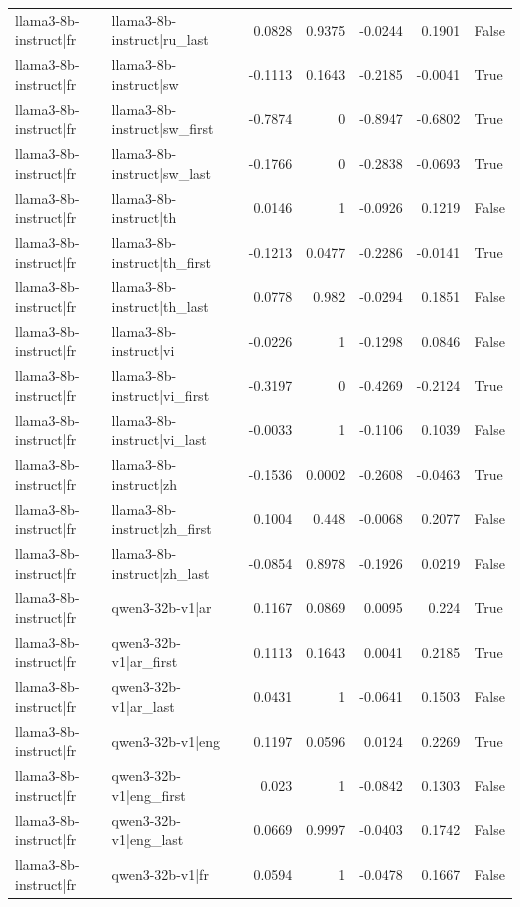 \begin{table}
\begin{tabular}{l l r r r r l}
llama3-8b-instruct|fr & llama3-8b-instruct|ru_last & 0.0828 & 0.9375 & -0.0244 & 0.1901 & False \\
llama3-8b-instruct|fr & llama3-8b-instruct|sw & -0.1113 & 0.1643 & -0.2185 & -0.0041 & True \\
llama3-8b-instruct|fr & llama3-8b-instruct|sw_first & -0.7874 & 0 & -0.8947 & -0.6802 & True \\
llama3-8b-instruct|fr & llama3-8b-instruct|sw_last & -0.1766 & 0 & -0.2838 & -0.0693 & True \\
llama3-8b-instruct|fr & llama3-8b-instruct|th & 0.0146 & 1 & -0.0926 & 0.1219 & False \\
llama3-8b-instruct|fr & llama3-8b-instruct|th_first & -0.1213 & 0.0477 & -0.2286 & -0.0141 & True \\
llama3-8b-instruct|fr & llama3-8b-instruct|th_last & 0.0778 & 0.982 & -0.0294 & 0.1851 & False \\
llama3-8b-instruct|fr & llama3-8b-instruct|vi & -0.0226 & 1 & -0.1298 & 0.0846 & False \\
llama3-8b-instruct|fr & llama3-8b-instruct|vi_first & -0.3197 & 0 & -0.4269 & -0.2124 & True \\
llama3-8b-instruct|fr & llama3-8b-instruct|vi_last & -0.0033 & 1 & -0.1106 & 0.1039 & False \\
llama3-8b-instruct|fr & llama3-8b-instruct|zh & -0.1536 & 0.0002 & -0.2608 & -0.0463 & True \\
llama3-8b-instruct|fr & llama3-8b-instruct|zh_first & 0.1004 & 0.448 & -0.0068 & 0.2077 & False \\
llama3-8b-instruct|fr & llama3-8b-instruct|zh_last & -0.0854 & 0.8978 & -0.1926 & 0.0219 & False \\
llama3-8b-instruct|fr & qwen3-32b-v1|ar & 0.1167 & 0.0869 & 0.0095 & 0.224 & True \\
llama3-8b-instruct|fr & qwen3-32b-v1|ar_first & 0.1113 & 0.1643 & 0.0041 & 0.2185 & True \\
llama3-8b-instruct|fr & qwen3-32b-v1|ar_last & 0.0431 & 1 & -0.0641 & 0.1503 & False \\
llama3-8b-instruct|fr & qwen3-32b-v1|eng & 0.1197 & 0.0596 & 0.0124 & 0.2269 & True \\
llama3-8b-instruct|fr & qwen3-32b-v1|eng_first & 0.023 & 1 & -0.0842 & 0.1303 & False \\
llama3-8b-instruct|fr & qwen3-32b-v1|eng_last & 0.0669 & 0.9997 & -0.0403 & 0.1742 & False \\
llama3-8b-instruct|fr & qwen3-32b-v1|fr & 0.0594 & 1 & -0.0478 & 0.1667 & False \\

\end{tabular}
\end{table}
